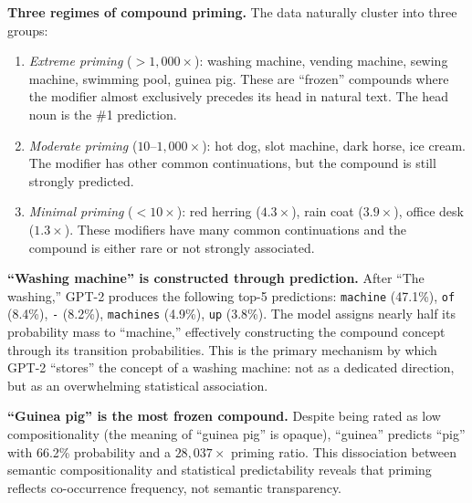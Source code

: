 {\bf Three regimes of compound priming.}
The data naturally cluster into three groups:
\begin{enumerate}[leftmargin=*,itemsep=0pt,topsep=0pt]
    \item \emph{Extreme priming} ($>1{,}000\times$): washing machine, vending machine, sewing machine, swimming pool, guinea pig. These are ``frozen'' compounds where the modifier almost exclusively precedes its head in natural text. The head noun is the \#1 prediction.
    \item \emph{Moderate priming} ($10$--$1{,}000\times$): hot dog, slot machine, dark horse, ice cream. The modifier has other common continuations, but the compound is still strongly predicted.
    \item \emph{Minimal priming} ($<10\times$): red herring ($4.3\times$), rain coat ($3.9\times$), office desk ($1.3\times$). These modifiers have many common continuations and the compound is either rare or not strongly associated.
\end{enumerate}

{\bf ``Washing machine'' is constructed through prediction.}
After ``The washing,'' GPT-2 produces the following top-5 predictions: \texttt{machine} (47.1\%), \texttt{of} (8.4\%), \texttt{-} (8.2\%), \texttt{machines} (4.9\%), \texttt{up} (3.8\%).
The model assigns nearly half its probability mass to ``machine,'' effectively constructing the compound concept through its transition probabilities.
This is the primary mechanism by which GPT-2 ``stores'' the concept of a washing machine: not as a dedicated direction, but as an overwhelming statistical association.

{\bf ``Guinea pig'' is the most frozen compound.}
Despite being rated as low compositionality (the meaning of ``guinea pig'' is opaque), ``guinea'' predicts ``pig'' with 66.2\% probability and a $28{,}037\times$ priming ratio.
This dissociation between semantic compositionality and statistical predictability reveals that priming reflects co-occurrence frequency, not semantic transparency.
